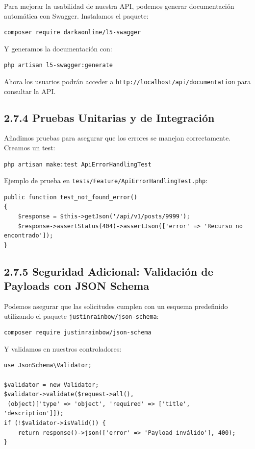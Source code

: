 \documentclass[11pt]{article}
\begin{document}
Para mejorar la usabilidad de nuestra API, podemos generar
documentación automática con Swagger. Instalamos el paquete:

\begin{verbatim}
composer require darkaonline/l5-swagger
\end{verbatim}

Y generamos la documentación con:

\begin{verbatim}
php artisan l5-swagger:generate
\end{verbatim}

Ahora los usuarios podrán acceder a
\texttt{http://localhost/api/documentation} para consultar la API.

\subsection{2.7.4 Pruebas Unitarias y de Integración}
\label{sec:org2be9c58}

Añadimos pruebas para asegurar que los errores se manejan
correctamente. Creamos un test:

\begin{verbatim}
php artisan make:test ApiErrorHandlingTest
\end{verbatim}

Ejemplo de prueba en \texttt{tests/Feature/ApiErrorHandlingTest.php}:

\begin{verbatim}
public function test_not_found_error()
{
    $response = $this->getJson('/api/v1/posts/9999');
    $response->assertStatus(404)->assertJson(['error' => 'Recurso no encontrado']);
}
\end{verbatim}

\subsection{2.7.5 Seguridad Adicional: Validación de Payloads con JSON Schema}
\label{sec:orgd4597a8}

Podemos asegurar que las solicitudes cumplen con un esquema
predefinido utilizando el paquete \texttt{justinrainbow/json-schema}:

\begin{verbatim}
composer require justinrainbow/json-schema
\end{verbatim}

Y validamos en nuestros controladores:

\begin{verbatim}
use JsonSchema\Validator;

$validator = new Validator;
$validator->validate($request->all(),
 (object)['type' => 'object', 'required' => ['title', 'description']]);
if (!$validator->isValid()) {
    return response()->json(['error' => 'Payload inválido'], 400);
}
\end{verbatim}
\end{document}
